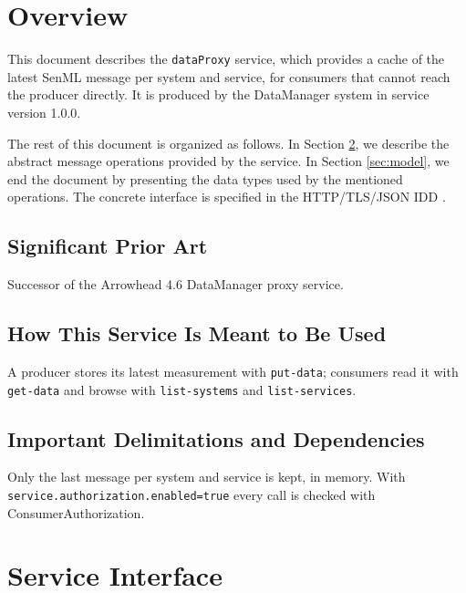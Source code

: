 \documentclass[a4paper]{arrowhead}
\begin{document}
\section{Overview}
\label{sec:overview}

This document describes the \texttt{dataProxy} service, which provides a cache of the latest SenML message per system and service, for consumers that cannot reach the producer directly.
It is produced by the DataManager system \cite{dm-sysd} in service version 1.0.0.

The rest of this document is organized as follows.
In Section \ref{sec:operations}, we describe the abstract message operations provided by the service.
In Section \ref{sec:model}, we end the document by presenting the data types used by the mentioned operations.
The concrete interface is specified in the HTTP/TLS/JSON IDD \cite{dm-dataProxy-http-idd}.

\subsection{Significant Prior Art}

Successor of the Arrowhead 4.6 DataManager proxy service.

\subsection{How This Service Is Meant to Be Used}

A producer stores its latest measurement with \texttt{put-\allowbreak{}data}; consumers read it with \texttt{get-\allowbreak{}data} and browse with \texttt{list-\allowbreak{}systems} and \texttt{list-\allowbreak{}services}.

\subsection{Important Delimitations and Dependencies}
\label{sec:delimitations}

Only the last message per system and service is kept, in memory. With \texttt{service.\allowbreak{}authorization.\allowbreak{}enabled=\allowbreak{}true} every call is checked with Consumer\allowbreak{}Authorization.

\newpage

\section{Service Interface}
\label{sec:operations}
\end{document}
